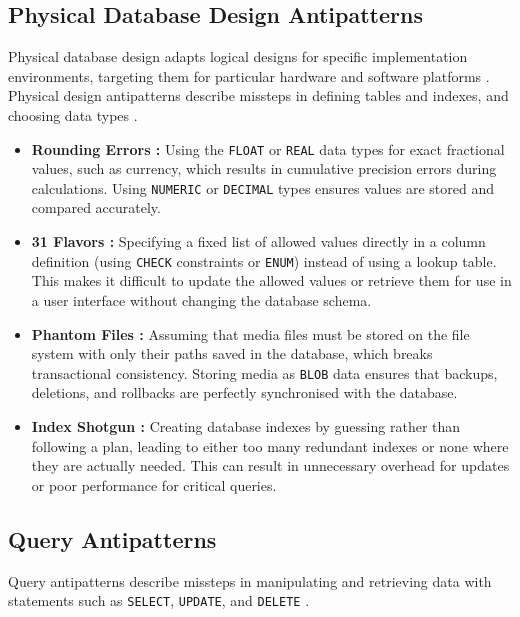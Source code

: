 \subsection{Physical Database Design Antipatterns}\label{sec:physicalAntipatterns}

Physical database design adapts logical designs for specific implementation environments, targeting them for particular hardware and software platforms . Physical design antipatterns describe missteps in defining tables and indexes, and choosing data types .

\begin{itemize}
    \item \textbf{Rounding Errors :} Using the \texttt{FLOAT} or \texttt{REAL} data types for exact fractional values, such as currency, which results in cumulative precision errors during calculations. Using \texttt{NUMERIC} or \texttt{DECIMAL} types ensures values are stored and compared accurately.
    \item \textbf{31 Flavors :} Specifying a fixed list of allowed values directly in a column definition (using \texttt{CHECK} constraints or \texttt{ENUM}) instead of using a lookup table. This makes it difficult to update the allowed values or retrieve them for use in a user interface without changing the database schema.
    \item \textbf{Phantom Files :} Assuming that media files must be stored on the file system with only their paths saved in the database, which breaks transactional consistency. Storing media as \texttt{BLOB} data ensures that backups, deletions, and rollbacks are perfectly synchronised with the database.
    \item \textbf{Index Shotgun :} Creating database indexes by guessing rather than following a plan, leading to either too many redundant indexes or none where they are actually needed. This can result in unnecessary overhead for updates or poor performance for critical queries.
\end{itemize}

\subsection{Query Antipatterns}\label{sec:queryAntipatterns}

Query antipatterns describe missteps in manipulating and retrieving data with statements such as \texttt{SELECT}, \texttt{UPDATE}, and \texttt{DELETE} .

